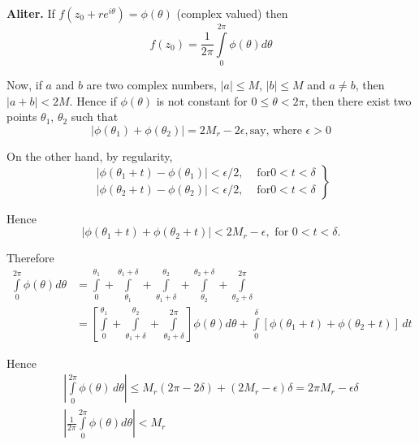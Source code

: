 \smallskip
\noindent\textbf{Aliter.}
If $f(z_0 + re^{i\theta}) = \phi (\theta)$ (complex valued)
then
$$
f(z_0) = \frac{1}{2\pi} \int\limits^{2\pi}_0 \phi(\theta) d\theta
$$

Now, if $a$ and $b$ are two complex numbers, $|a| \leq M$, $|b| \leq
M$ and $a \neq b$, then $|a+b|<2M$. Hence if $\phi (\theta)$ is not
constant for $0 \leq \theta < 2 \pi$, then there exist two points
$\theta_1$, $\theta_2$ such that
$$
|\phi (\theta_1) + \phi (\theta_2)| = 2 M_r - 2 \epsilon, \text{
  say, where } \epsilon >0
$$

On the other hand, by regularity,
\begin{equation*}
\left. \begin{aligned}
|\phi (\theta_1 +t ) - \phi (\theta_1)| < \epsilon/2, & \text{ for
} 0 < t < \delta \\[4pt]
|\phi (\theta_2 + t) - \phi (\theta_2)| < \epsilon/2, & \text{ for
} 0 < t < \delta
\end{aligned} \right\}
\end{equation*}

Hence
$$
| \phi (\theta_1 + t) + \phi (\theta_2 + t)| < 2 M_r - \epsilon,
\text{ for } 0 < t < \delta.
$$

Therefore
\begin{align*}
\int\limits^{2\pi}_0 \phi(\theta) d \theta & =
\int\limits^{\theta_1}_0 + \int\limits^{\theta_1+\delta}_{\theta_1} +
\int\limits^{\theta_2}_{\theta_1 + \delta} + \int\limits^{\theta_2 +
  \delta}_{\theta_2} + \int\limits^{2\pi}_{\theta_2 + \delta}\\
& = \left[\int\limits^{\theta_1}_{0} +
  \int\limits^{\theta_2}_{\theta_1+\delta} +
  \int\limits^{2\pi}_{\theta_2 + \delta} \right] \phi (\theta) d\theta
+ \int\limits^\delta_0 [\phi (\theta_1 +t) + \phi (\theta_2 + t)] \, dt
\end{align*}

Hence
\begin{gather*}
\left|\int\limits^{2\pi}_0 \phi (\theta) \, d \theta \right| \leq M_r (2\pi -
2\delta) + (2M_r- \epsilon) \delta = 2 \pi M_r - \epsilon \delta
\\
\left|\frac{1}{2\pi} \int\limits^{2\pi}_0 \phi (\theta) d\theta \right| < M_r
\end{gather*}


